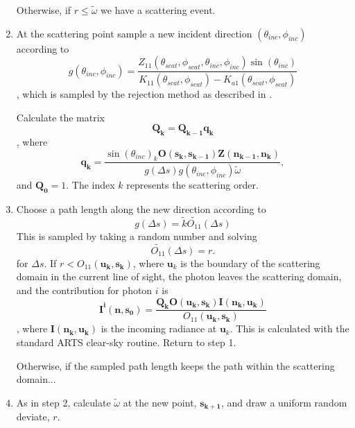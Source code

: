 \begin{enumerate}
Otherwise, if $r\le\tilde{\omega}$
we have a scattering event.
\item
At the scattering point sample a new incident direction
  $(\theta_{inc},\phi_{inc})$ according to 
\begin{equation}
g(\theta_{inc},\phi_{inc})=\frac{Z_{11}(\theta_{scat},\phi_{scat},
\theta_{inc},\phi_{inc})\sin(\theta_{inc})}{K_{11}(\theta_{scat},\phi_{scat})
  - K_{a1}(\theta_{scat},\phi_{scat})}
\label{gdir}
\end{equation}
, which is
sampled by the rejection method as described in \cite{liu01}.

Calculate the matrix
\begin{equation}
\mathbf{Q_k}=\mathbf{Q_{k-1}q_k}
\label{Q}
\end{equation}
, where
\begin{equation}
\mathbf{q_k}=\frac{\sin(\theta_{inc})_k
  \mathbf{O(s_k,s_{k-1})}\mathbf{Z(n_{k-1},n_k)}}
  {g\left(\Delta s\right)g(\theta_{inc},\phi_{inc}) \tilde{\omega}} ,
\label{q}
\end{equation}
and $\mathbf{Q_0}={1}$. The index $k$ represents the
scattering order.
\item
Choose a path length along the new direction according to
\begin{equation}
g(\Delta s)=\tilde{k}\tilde{O_{11}}(\Delta s)
\label{gDeltas}
\end{equation}
This is sampled by taking a random number and solving 
\begin{equation}
\tilde{O_{11}}(\Delta s)=r.
\label{solvefor0}
\end{equation}
for $\Delta s$.
If $r<O_{11}(\mathbf{u_{k},s_k})$, where $\mathbf{u}_{k}$ is the
  boundary of the scattering domain in the current line of sight, the
  photon leaves the scattering domain, and the contribution for photon $i$ is
\begin{equation}
\mathbf{I^i(n,s_0)}=\frac{\mathbf{Q_k}\mathbf{O(u_k,s_k)I(n_k,u_k)}}{O_{11}(\mathbf{u_{k},s_k})}
\label{Ikmax2_1}
\end{equation}
, where 
$\mathbf{I(n_k,u_k)}$ is the incoming radiance at $\mathbf{u}_{k}$.  This is calculated with the standard ARTS clear-sky
routine. Return to step 1.

Otherwise, if the sampled path length keeps the path within the
scattering domain...
\item
As in step 2, calculate 
$\tilde{\omega}$ at the new point, $\mathbf{s_{k+1}}$, and draw a uniform
  random deviate, $r$.


\end{enumerate}
